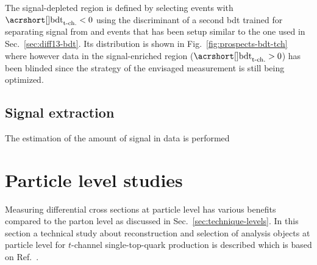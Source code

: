 
The signal-depleted region is defined by selecting events with $\bdttch<0$ using the discriminant of a second \gls{bdt} trained for separating signal from \wjets and \ttbar events that has been setup similar to the one used in Sec.~\ref{sec:diff13-bdt}. Its distribution is shown in Fig.~\ref{fig:prospects-bdt-tch} where however data in the signal-enriched region ($\bdttch>0$) has been blinded since the strategy of the envisaged measurement is still being optimized.


\subsection{Signal extraction}
\label{sec:prospects-fit}

The estimation of the amount of signal in data is performed 


\section{Particle level studies}
\label{sec:prospects-fiducial-studies}

Measuring differential cross sections at particle level has various benefits compared to the parton level as discussed in Sec.~\ref{sec:technique-levels}. In this section a technical study about reconstruction and selection of analysis objects at particle level for $t$-channel single-top-quark production is described which is based on Ref.~\cite{particleStudies}.


